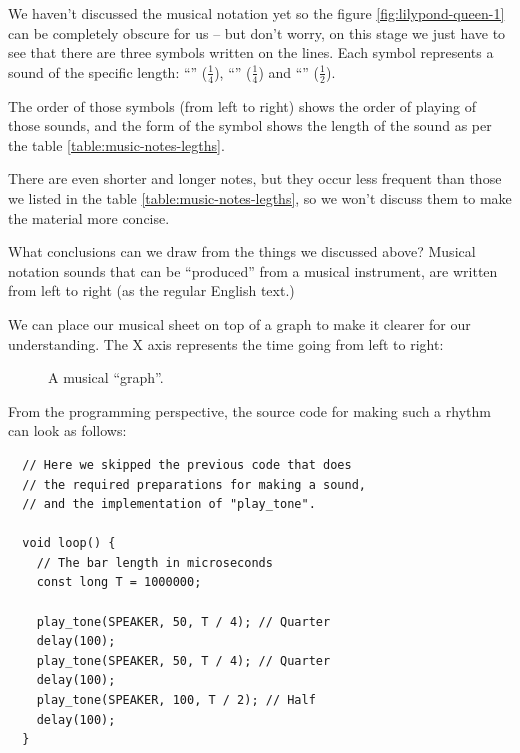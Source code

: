 \documentclass[../sparc.tex]{subfiles}
\begin{document}
We haven't discussed the musical notation yet so the figure
\ref{fig:lilypond-queen-1} can be completely obscure for us -- but don't worry,
on this stage we just have to see that there are three symbols written on the
lines.  Each symbol represents a sound of the specific length: ``\quarterNote''
($\frac{1}{4}$), ``\quarterNote'' ($\frac{1}{4}$) and ``\halfNote''
($\frac{1}{2}$).

The order of those symbols (from left to right) shows the order of playing of
those sounds, and the form of the symbol shows the length of the sound as per
the table \ref{table:music-notes-legths}.


There are even shorter and longer notes, but they occur less frequent than those
we listed in the table \ref{table:music-notes-legths}, so we won't discuss them
to make the material more concise.

What conclusions can we draw from the things we discussed above?  Musical
notation sounds that can be ``produced'' from a musical instrument, are written
from left to right (as the regular English text.)

We can place our musical sheet on top of a graph to make it clearer for our
understanding.  The $\mbox{X}$ axis represents the time going from left to
right:

\begin{figure}[ht]
  \centering

  \caption{A musical ``graph''.}
  \label{fig:lilypond-musical-graph}
\end{figure}

From the programming perspective, the source code for making such a rhythm can
look as follows:

\begin{verbatim}
  // Here we skipped the previous code that does
  // the required preparations for making a sound,
  // and the implementation of "play_tone".

  void loop() {
    // The bar length in microseconds
    const long T = 1000000;

    play_tone(SPEAKER, 50, T / 4); // Quarter
    delay(100);
    play_tone(SPEAKER, 50, T / 4); // Quarter
    delay(100);
    play_tone(SPEAKER, 100, T / 2); // Half
    delay(100);
  }
\end{verbatim}
\end{document}
